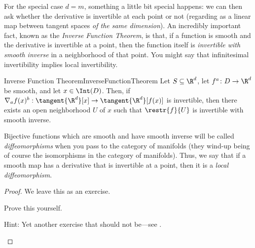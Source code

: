 For the special case $d=m$, something a little bit special happens:  we can then ask whether the derivative is invertible at each point or not (regarding as a linear map between tangent spaces \emph{of the same dimension}).  An incredibly important fact, known as the \emph{Inverse Function Theorem}, is that, if a function is smooth and the derivative is invertible at a point, then the function itself is \emph{invertible with smooth inverse} in a neighborhood of that point.  You might say that infinitesimal invertibility implies local invertibility.
\begin{thm}{Inverse Function Theorem}{InverseFunctionTheorem}
Let $S\subseteq \R ^d$, let $f^a\colon D\rightarrow \R ^d$ be smooth, and let $x\in \Int (D)$.  Then, if $\nabla _af(x)^b:\tangent{\R ^d}[x]\rightarrow \tangent{\R ^d}[f(x)]$ is invertible, then there exists an open neighborhood $U$ of $x$ such that $\restr{f}{U}$ is invertible with smooth inverse.
\begin{rmk}
Bijective functions which are smooth and have smooth inverse will be called \emph{diffeomorphisms} when you pass to the category of manifolds (they wind-up being of course the isomorphisms in the category of manifolds).  Thus, we say that if a smooth map has a derivative that is invertible at a point, then it is a \emph{local diffeomorphism}.
\end{rmk}
\begin{proof}
We leave this as an exercise.
\begin{exr}[breakable=false]{}{}
Prove this yourself.
\begin{rmk}
Hint:  Yet another exercise that should not be---see \cite[pg.~221]{Rudin}.
\end{rmk}
\end{exr}
\end{proof}
\end{thm}